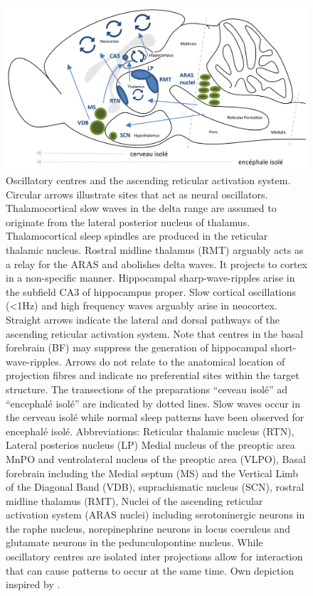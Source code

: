 \begin{figure}[!htb]
\centering
\includegraphics[width=\textwidth,height=\textheight,keepaspectratio]{Figures/oscillatory_centres_and_the_ascending_reticular_activation_system}
\decoRule
\caption[Oscillatory centres and the ascending reticular activation system]{Oscillatory centres and the ascending reticular activation system.\\
Circular arrows illustrate sites that act as neural oscillators. Thalamocortical slow waves in the delta range are assumed to originate from the lateral posterior nucleus of thalamus. Thalamocortical sleep spindles are produced in the reticular thalamic nucleus. Rostral midline thalamus (RMT) arguably acts as a relay for the ARAS and abolishes delta waves. It projects to cortex in a non-specific manner. Hippocampal sharp-wave-ripples arise in the subfield CA3 of hippocampus proper. Slow cortical oscillations (<1Hz) and high frequency waves arguably arise in neocortex. Straight arrows indicate the lateral and dorsal pathways of the ascending reticular activation system. Note that centres in the basal forebrain (BF) may suppress the generation of hippocampal short-wave-ripples. Arrows do not relate to the anatomical location of projection fibres and indicate no preferential sites within the target structure. The transections of the preparations “ceveau isolé” ad “encephalé isolé” are indicated by dotted lines. Slow waves occur in the cerveau isolé while normal sleep patterns have been observed for encephalé isolé. Abbreviations: Reticular thalamic nucleus (RTN), Lateral posterios nucleus (LP) Medial nucleus of the preoptic area MnPO and ventrolateral nucleus of the preoptic area (VLPO),  Basal forebrain including the
Medial septum (MS) and the Vertical Limb of the Diagonal Band (VDB), suprachismatic nucleus (SCN), rostral midline thalamus (RMT), Nuclei of the ascending reticular activation system (ARAS nuclei) including serotoninergic neurons in the raphe nucleus, norepinephrine neurons in locus coeruleus and glutamate neurons in the pedunculopontine nucleus. While oscillatory centres are isolated inter projections allow for interaction that can cause patterns to occur at the same time. Own depiction inspired by \parencite[1099]{brown2012control}.}
\label{fig:oscillatory_centres_and_the_ascending_reticular_activation_system}
\end{figure}
